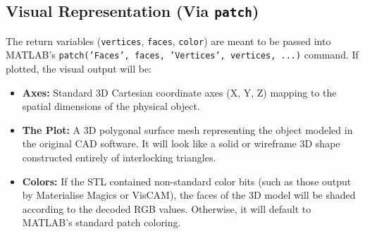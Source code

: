 \subsection*{Visual Representation (Via \texttt{patch})}
The return variables (\texttt{vertices}, \texttt{faces}, \texttt{color}) are meant to be passed into MATLAB's \texttt{patch('Faces', faces, 'Vertices', vertices, ...)} command. If plotted, the visual output will be:
\begin{itemize}
    \item \textbf{Axes:} Standard 3D Cartesian coordinate axes (X, Y, Z) mapping to the spatial dimensions of the physical object.
    \item \textbf{The Plot:} A 3D polygonal surface mesh representing the object modeled in the original CAD software. It will look like a solid or wireframe 3D shape constructed entirely of interlocking triangles.
    \item \textbf{Colors:} If the STL contained non-standard color bits (such as those output by Materialise Magics or VisCAM), the faces of the 3D model will be shaded according to the decoded RGB values. Otherwise, it will default to MATLAB's standard patch coloring.
\end{itemize}

